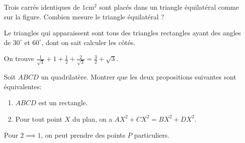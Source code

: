 \begin{exo}
Trois carrés identiques de $1\mathrm{cm}^2$ sont placés dans un triangle équilatéral comme sur la figure.
Combien mesure le triangle équilatéral ?
\begin{center}
\end{center}
\begin{hint}
Le triangles qui apparaissent sont tous des triangles rectangles ayant des angles de $30^\circ$ et $60^\circ$, dont on sait calculer les côtés.
\end{hint}
\begin{sol}
On trouve $\frac{1}{\sqrt 3}+1+\frac12+\frac{2}{\sqrt 3} = \frac32+\sqrt 3$.
\end{sol}
\end{exo}


\begin{exo}
Soit $ABCD$ un quadrilatère. Montrer que les deux propositions suivantes sont équivalentes:
\begin{enumerate}
\item $ABCD$ est un rectangle.
\item Pour tout point $X$ du plan, on a $AX^2+CX^2 = BX^2+DX^2$.
\end{enumerate}
\begin{hint}
Pour $2\implies 1$, on peut prendre des points $P$ particuliers.
\end{hint}
\end{exo}



